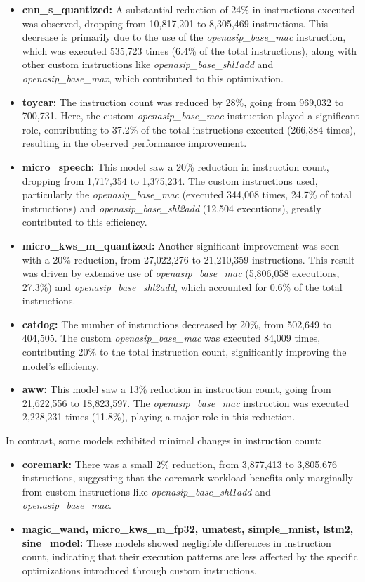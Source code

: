 \begin{itemize}
    \item \textbf{cnn\_s\_quantized:} A substantial reduction of 24\% in instructions executed was observed, dropping from 10,817,201 to 8,305,469 instructions. This decrease is primarily due to the use of the \textit{openasip\_base\_mac} instruction, which was executed 535,723 times (6.4\% of the total instructions), along with other custom instructions like \textit{openasip\_base\_shl1add} and \textit{openasip\_base\_max}, which contributed to this optimization.
    \item \textbf{toycar:} The instruction count was reduced by 28\%, going from 969,032 to 700,731. Here, the custom \textit{openasip\_base\_mac} instruction played a significant role, contributing to 37.2\% of the total instructions executed (266,384 times), resulting in the observed performance improvement.
    \item \textbf{micro\_speech:} This model saw a 20\% reduction in instruction count, dropping from 1,717,354 to 1,375,234. The custom instructions used, particularly the \textit{openasip\_base\_mac} (executed 344,008 times, 24.7\% of total instructions) and \textit{openasip\_base\_shl2add} (12,504 executions), greatly contributed to this efficiency.
    \item \textbf{micro\_kws\_m\_quantized:} Another significant improvement was seen with a 20\% reduction, from 27,022,276 to 21,210,359 instructions. This result was driven by extensive use of \textit{openasip\_base\_mac} (5,806,058 executions, 27.3\%) and \textit{openasip\_base\_shl2add}, which accounted for 0.6\% of the total instructions.
    \item \textbf{catdog:} The number of instructions decreased by 20\%, from 502,649 to 404,505. The custom \textit{openasip\_base\_mac} was executed 84,009 times, contributing 20\% to the total instruction count, significantly improving the model's efficiency.
    \item \textbf{aww:} This model saw a 13\% reduction in instruction count, going from 21,622,556 to 18,823,597. The \textit{openasip\_base\_mac} instruction was executed 2,228,231 times (11.8\%), playing a major role in this reduction.
\end{itemize}

In contrast, some models exhibited minimal changes in instruction count:
\begin{itemize}
    \item \textbf{coremark:} There was a small 2\% reduction, from 3,877,413 to 3,805,676 instructions, suggesting that the coremark workload benefits only marginally from custom instructions like \textit{openasip\_base\_shl1add} and \textit{openasip\_base\_mac}.
    \item \textbf{magic\_wand, micro\_kws\_m\_fp32, umatest, simple\_mnist, lstm2, sine\_model:} These models showed negligible differences in instruction count, indicating that their execution patterns are less affected by the specific optimizations introduced through custom instructions.
\end{itemize}

